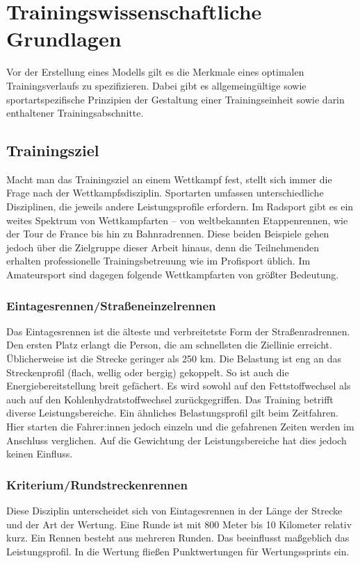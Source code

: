 \chapter{Trainingswissenschaftliche Grundlagen}
\label{sec:grundlagen:rad}
Vor der Erstellung eines Modells gilt es die Merkmale eines optimalen Trainingsverlaufs zu spezifizieren. Dabei gibt es allgemeingültige sowie sportartspezifische Prinzipien der Gestaltung einer Trainingseinheit sowie darin enthaltener Trainingsabschnitte.

\section{Trainingsziel}
Macht man das Trainingsziel an einem Wettkampf fest, stellt sich immer die Frage nach der Wettkampfsdisziplin. Sportarten umfassen unterschiedliche Disziplinen, die jeweils andere Leistungsprofile erfordern. Im Radsport gibt es ein weites Spektrum von Wettkampfarten -- von weltbekannten Etappenrennen, wie der Tour de France bis hin zu Bahnradrennen. Diese beiden Beispiele gehen jedoch über die Zielgruppe dieser Arbeit hinaus, denn die Teilnehmenden erhalten professionelle Trainingsbetreuung wie im Profisport üblich. Im Amateursport sind dagegen folgende Wettkampfarten von größter Bedeutung.
\subsection{Eintagesrennen/Straßeneinzelrennen}
\label{eintagesrennen}
Das Eintagesrennen ist die älteste und verbreitetste Form der Straßenradrennen. Den ersten Platz erlangt die Person, die am schnellsten die Ziellinie erreicht.
Üblicherweise ist die Strecke geringer als 250 km. Die Belastung ist eng an das Streckenprofil (flach, wellig oder bergig) gekoppelt. So ist auch die Energiebereitstellung breit gefächert. Es wird sowohl auf den Fettstoffwechsel als auch auf den Kohlenhydratstoffwechsel zurückgegriffen.  Das Training betrifft diverse Leistungsbereiche.
Ein ähnliches Belastungsprofil gilt beim Zeitfahren. Hier starten die Fahrer:innen jedoch einzeln und die gefahrenen Zeiten werden im Anschluss verglichen. Auf die Gewichtung der Leistungsbereiche hat dies jedoch keinen Einfluss. 
\subsection{Kriterium/Rundstreckenrennen}
Diese Disziplin unterscheidet sich von Eintagesrennen in der Länge der Strecke und der Art der Wertung. Eine Runde ist mit 800 Meter bis 10 Kilometer relativ kurz. Ein Rennen besteht aus mehreren Runden. 
Das beeinflusst maßgeblich das Leistungsprofil. 
In die Wertung fließen Punktwertungen für Wertungssprints ein. 

